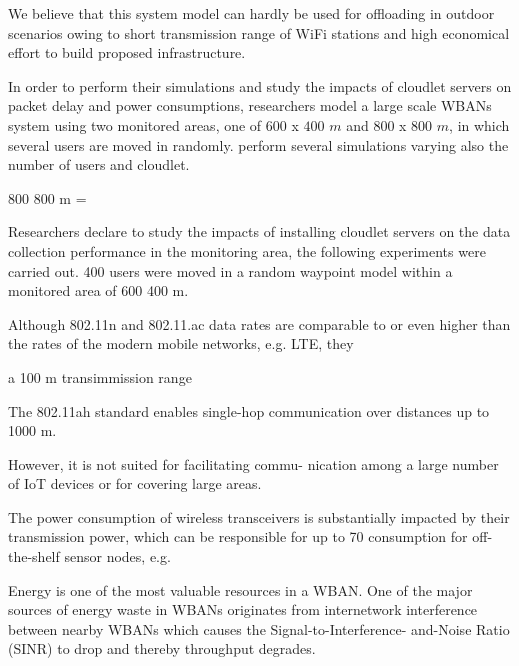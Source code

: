\documentclass[sigchi]{acmart}
\begin{document}
We believe that this system model can hardly be used for offloading in outdoor scenarios owing to short transmission range of WiFi stations and high economical effort to build proposed infrastructure.



In order to perform their simulations and study the impacts of cloudlet servers on packet delay and power consumptions, researchers model a large scale WBANs system using two monitored areas, one of $600$ x $400$ $m$ and $800$ x $800$ $m$, in which several users are moved in randomly. \citet{MSAReport} perform several simulations varying also the number of users and cloudlet.





 800 800 m = 

Researchers declare to study the impacts of installing cloudlet servers on the data collection performance in the monitoring area, the
following experiments were carried out. 400 users were moved in a random waypoint model within a monitored area of
600 400 m.


Although 802.11n and 802.11.ac data rates are comparable to or
even higher than the rates of the modern mobile networks, e.g. LTE, they


a 100 m transimmission range







The 802.11ah standard enables single-hop communication over distances up to 1000 m.



However, it is not suited for facilitating commu-
nication among a large number of IoT devices or for covering
large areas.











The power consumption of wireless transceivers is 
substantially impacted by their transmission power, which 
can be responsible for up to 70%
consumption for off-the-shelf sensor nodes, e.g.

Energy is one of the most valuable resources in a 
WBAN. One of the major sources of energy waste in 
WBANs originates from internetwork interference between 
nearby WBANs which causes the Signal-to-Interference-
and-Noise Ratio (SINR) to drop and thereby throughput 
degrades.
\end{document}
